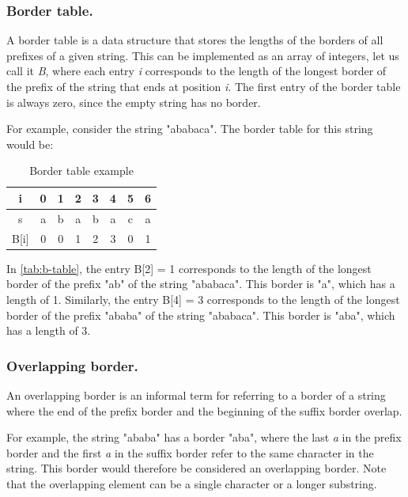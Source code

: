 \documentclass{l4proj}
\begin{document}
\subsubsection{Border table.}

A border table is a data structure that stores the lengths of the borders of all prefixes of a given string. This can be implemented as an array of integers, let us call it \emph{B}, where each entry \emph{i} corresponds to the length of the longest border of the prefix of the string that ends at position \emph{i}. The first entry of the border table is always zero, since the empty string has no border.

For example, consider the string "ababaca". The border table for this string would be:

\begin{table}[!h]
\begin{center}
\begin{tabular}{|c||c|c|c|c|c|c|c|}
	\hline
	i & 0 & 1 & 2 & 3 & 4 & 5 & 6 \\
	\hline
	s & a & b & a & b & a & c & a \\
	\hline
	B[i] & 0 & 0 & 1 & 2 & 3 & 0 & 1 \\ 
	\hline
\end{tabular}
\caption{\label{tab:b-table}Border table example}
\end{center}
\end{table}


In \autoref{tab:b-table}, the entry B[2] = 1 corresponds to the length of the longest border of the prefix "ab" of the string "ababaca". This border is "a", which has a length of 1. Similarly, the entry B[4] = 3 corresponds to the length of the longest border of the prefix "ababa" of the string "ababaca". This border is "aba", which has a length of 3.

\subsubsection{Overlapping border.}
An overlapping border is an informal term for referring to a border of a string where the end of the prefix border and the beginning of the suffix border overlap.

For example, the string "ababa" has a border "aba", where the last \emph{a} in the prefix border and the first \emph{a} in the suffix border refer to the same character in the string. This border would therefore be considered an overlapping border. Note that the overlapping element can be a single character or a longer substring.
\end{document}
